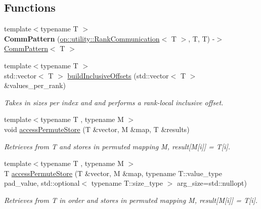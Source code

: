 \subsection*{Functions}
\begin{DoxyCompactItemize}
\item 
\hypertarget{namespaceop_1_1utility_a60483a17e3e56dd648ce82fe723e2403}{{\footnotesize template$<$typename T $>$ }\\{\bfseries Comm\-Pattern} (\hyperlink{structop_1_1utility_1_1RankCommunication}{op\-::utility\-::\-Rank\-Communication}$<$ T $>$, T, T) -\/$>$ \hyperlink{structop_1_1utility_1_1CommPattern}{Comm\-Pattern}$<$ T $>$}\label{namespaceop_1_1utility_a60483a17e3e56dd648ce82fe723e2403}

\item 
{\footnotesize template$<$typename T $>$ }\\std\-::vector$<$ T $>$ \hyperlink{namespaceop_1_1utility_a5a4064fa906d17d554575668c01b384c}{build\-Inclusive\-Offsets} (std\-::vector$<$ T $>$ \&values\-\_\-per\-\_\-rank)
\begin{DoxyCompactList}\small\item\em Takes in sizes per index and and performs a rank-\/local inclusive offset. \end{DoxyCompactList}\item 
{\footnotesize template$<$typename T , typename M $>$ }\\void \hyperlink{namespaceop_1_1utility_aa6108c4b841743117ced37cec31f1893}{access\-Permute\-Store} (T \&vector, M \&map, T \&results)
\begin{DoxyCompactList}\small\item\em Retrieves from T and stores in permuted mapping M, result\mbox{[}M\mbox{[}i\mbox{]}\mbox{]} = T\mbox{[}i\mbox{]}. \end{DoxyCompactList}\item 
{\footnotesize template$<$typename T , typename M $>$ }\\T \hyperlink{namespaceop_1_1utility_afb3a26e97b506e05629c36b957131122}{access\-Permute\-Store} (T \&vector, M \&map, typename T\-::value\-\_\-type pad\-\_\-value, std\-::optional$<$ typename T\-::size\-\_\-type $>$ arg\-\_\-size=std\-::nullopt)
\begin{DoxyCompactList}\small\item\em Retrieves from T in order and stores in permuted mapping M, result\mbox{[}M\mbox{[}i\mbox{]}\mbox{]} = T\mbox{[}i\mbox{]}. \end{DoxyCompactList}\item 

\end{DoxyCompactItemize}
